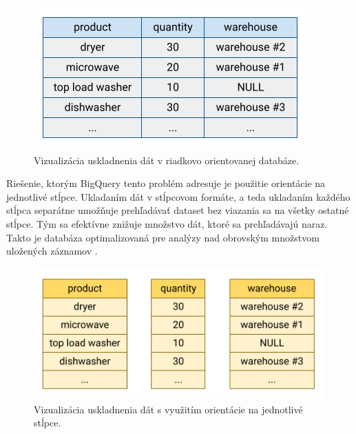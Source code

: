 \begin{figure}[htb]
\begin{center}
 \includegraphics[scale=0.7]{obrazky-figures/row-oriented-store.png}
 \caption{\centering Vizualizácia uskladnenia dát v riadkovo orientovanej databáze.}
 \label{img:row-oriented-store}
\end{center}
\end{figure}

Riešenie, ktorým BigQuery tento problém adresuje je použitie orientácie na jednotlivé stĺpce. 
Ukladaním dát v stĺpcovom formáte, a teda ukladaním každého stĺpca separátne umožňuje prehľadávať dataset bez viazania sa na všetky ostatné stĺpce.
Tým sa efektívne znižuje množstvo dát, ktoré sa prehľadávajú naraz.
Takto je databáza optimalizovaná pre analýzy nad obrovským množstvom uložených záznamov \cite{google-bq}.

\begin{figure}[htb]
\begin{center}
 \includegraphics[scale=0.7]{obrazky-figures/column-oriented-store.png}
 \caption{\centering Vizualizácia uskladnenia dát s využitím orientácie na jednotlivé stĺpce.}
 \label{img:column-oriented-store}
\end{center}
\end{figure}


